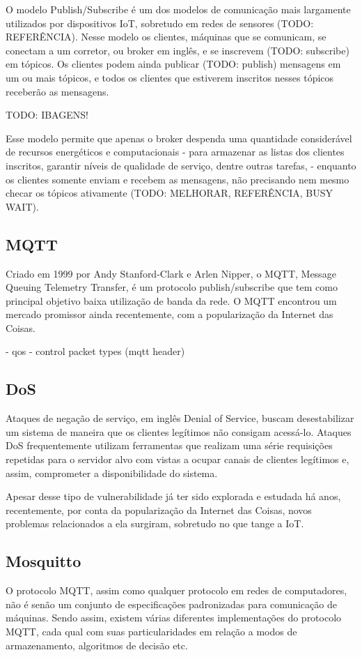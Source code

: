 O modelo Publish/Subscribe é um dos modelos de comunicação mais largamente utilizados por dispositivos IoT, sobretudo em redes de sensores (TODO: REFERÊNCIA). Nesse modelo os clientes, máquinas que se comunicam, se conectam a um corretor, ou broker em inglês, e se inscrevem (TODO: subscribe) em tópicos. Os clientes podem ainda publicar (TODO: publish) mensagens em um ou mais tópicos, e todos os clientes que estiverem inscritos nesses tópicos receberão as mensagens.

TODO: IBAGENS!

Esse modelo permite que apenas o broker despenda uma quantidade considerável de recursos energéticos e computacionais \-- para armazenar as listas dos clientes inscritos, garantir níveis de qualidade de serviço, dentre outras tarefas, \-- enquanto os clientes somente enviam e recebem as mensagens, não precisando nem mesmo checar os tópicos ativamente (TODO: MELHORAR, REFERÊNCIA, BUSY WAIT).


\subsection{MQTT}
Criado em 1999 por Andy Stanford-Clark e Arlen Nipper, o MQTT, Message Queuing Telemetry Transfer, é um protocolo publish/subscribe  que tem como principal objetivo baixa utilização de banda da rede. O MQTT encontrou um mercado promissor ainda recentemente, com a popularização da Internet das Coisas.

- qos
- control packet types (mqtt header)





\subsection{DoS}
Ataques de negação de serviço, em inglês Denial of Service, buscam desestabilizar um sistema de maneira que os clientes legítimos não consigam acessá-lo. Ataques DoS frequentemente utilizam ferramentas que realizam uma série requisições repetidas para o servidor alvo com vistas a ocupar canais de clientes legítimos e, assim, comprometer a disponibilidade do sistema.

Apesar desse tipo de vulnerabilidade já ter sido explorada e estudada há anos, recentemente, por conta da popularização da Internet das Coisas, novos problemas relacionados a ela surgiram, sobretudo no que tange a IoT.


\subsection{Mosquitto}
O protocolo MQTT, assim como qualquer protocolo em redes de computadores, não é senão um conjunto de especificações padronizadas para comunicação de máquinas. Sendo assim, existem várias diferentes implementações do protocolo MQTT, cada qual com suas particularidades em relação a modos de armazenamento, algoritmos de decisão etc.

